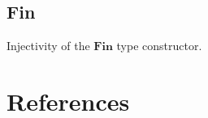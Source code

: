 \begin{refsection}
\begin{subappendices}
\subsection{Fin} \label{agda-fin}
Injectivity of the \(\textbf{Fin}\) type constructor.
\section{References}
\printbibliography[heading=none]
\end{subappendices}
\end{refsection}


